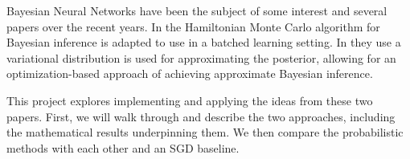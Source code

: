 Bayesian Neural Networks have been the subject of some interest and several papers over the recent years. 
In \cite{chen_stochastic_2014} the Hamiltonian Monte Carlo algorithm for Bayesian inference is adapted to use in a batched learning setting. 
In \cite{blundell_weight_2015} they use a variational distribution is used for approximating the posterior, allowing for an optimization-based approach of achieving approximate Bayesian inference.

This project explores implementing and applying the ideas from these two papers.
First, we will walk through and describe the two approaches, including the mathematical results underpinning them.
We then compare the probabilistic methods with each other and an SGD baseline.

